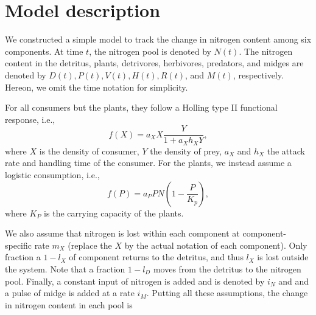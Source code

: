 \documentclass[12pt]{article}
\begin{document}
\maketitle

\section{Model description} %
\label{sec:model_description}

We constructed a simple model to track the change in nitrogen content among six components.
At time $t$, the nitrogen pool is denoted by $N(t)$.
The nitrogen content in the detritus, plants, detrivores, herbivores, predators, and midges are denoted by $D(t), P(t), V(t), H(t), R(t)$, and $M(t)$, respectively.
Hereon, we omit the time notation for simplicity.

For all consumers but the plants, they follow a Holling type II functional response, i.e.,
\begin{equation}
  	\label{eq:Holling_II}
  	f(X) = a_X X \frac{Y}{1 + a_X h_X Y},
  \end{equation}  
where $X$ is the density of consumer, $Y$ the density of prey, $a_X$ and $h_X$ the attack rate and handling time of the consumer.
For the plants, we instead assume a logistic consumption, i.e.,
\begin{equation}
	\label{eq:Logistic}
	f(P) = a_P P N (1 - \frac{P}{K_p}),
\end{equation}
where $K_P$ is the carrying capacity of the plants.

We also assume that nitrogen is lost within each component at component-specific rate $m_X$ (replace the $X$ by the actual notation of each component). 
Only fraction a $1- l_X$ of component returns to the detritus, and thus $l_X$ is lost outside the system. 
Note that a fraction $1 - l_D$ moves from the detritus to the nitrogen pool.
Finally, a constant input of nitrogen is added and is denoted by $i_N$ and and a pulse of midge is added at a rate $i_M$.
Putting all these assumptions, the change in nitrogen content in each pool is 
\end{document}
